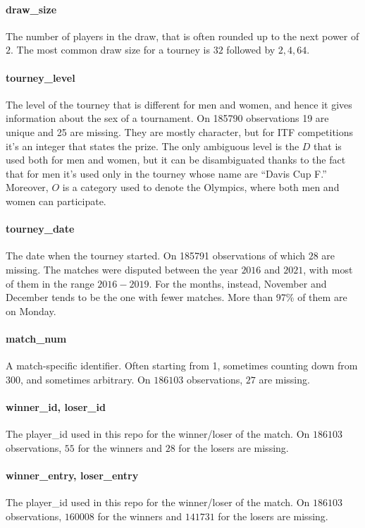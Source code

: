 \documentclass{article}
\begin{document}
\paragraph{draw\_size}
The number of players in the draw, that is often rounded up to the next power of $2$. The most common draw size for a tourney is $32$ followed by $2,4,64$.

\paragraph{tourney\_level}
The level of the tourney that is different for men and women, and hence it gives information about the sex of a tournament. On 185790 observations 19 are unique and 25 are missing. They are mostly character, but for ITF competitions it's an integer that states the prize. The only ambiguous level is the $D$ that is used both for men and women, but it can be disambiguated thanks to the fact that for men it's used only in the tourney whose name are “Davis Cup F.” Moreover, $O$ is a category used to denote the Olympics, where both men and women can participate. 

\paragraph{tourney\_date}
The date when the tourney started. On 185791 observations of which $28$ are missing.
The matches were disputed between the year $2016$ and $2021$, with most of them in the range $2016-2019$. For the months, instead, November and December tends to be the one with fewer matches. More than 97\% of them are on Monday.

\paragraph{match\_num}
A match-specific identifier. Often starting from 1, sometimes counting
down from 300, and sometimes arbitrary. On $186103$ observations, $27$ are missing.

\paragraph{winner\_id, loser\_id}
The player\_id used in this repo for the winner/loser of the match. On $186103$ observations, $55$ for the winners and $28$ for the losers are missing.

\paragraph{winner\_entry, loser\_entry}
The player\_id used in this repo for the winner/loser of the match. On $186103$ observations, $160008$ for the winners and $141731$ for the losers are missing.
\end{document}

